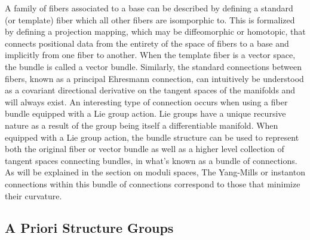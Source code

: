 \documentclass{article}
\begin{document}
    A family of fibers associated to a base can be described by defining a standard (or template) fiber which all other fibers are isomporphic to. This is formalized by defining a projection mapping, which may be diffeomorphic or homotopic, that connects positional data from the entirety of the space of fibers to a base and implicitly from one fiber to another. When the template fiber is a vector space, the bundle is called a vector bundle. Similarly, the standard connections between fibers, known as a principal Ehresmann connection, can intuitively be understood as a covariant directional derivative on the tangent spaces of the manifolds and will always exist. An interesting type of connection occurs when using a fiber bundle equipped with a Lie group action. Lie groups have a unique recursive nature as a result of the group being itself a differentiable manifold. When equipped with a Lie group action, the bundle structure can be used to represent both the original fiber or vector bundle as well as a higher level collection of tangent spaces connecting bundles, in what's known as a bundle of connections. As will be explained in the section on moduli spaces, The Yang-Mills or instanton connections within this bundle of connections correspond to those that minimize their curvature. 
    
    

\subsection{A Priori Structure Groups}
    
    
\end{document}
